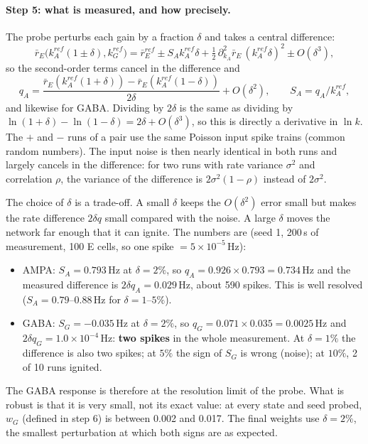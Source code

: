 \documentclass[11pt]{article}
\newcommand{\kA}{k_A}
\newcommand{\kG}{k_G}
\begin{document}
\paragraph{Step 5: what is measured, and how precisely.}
The probe perturbs each gain by a fraction $\delta$ and takes a central difference:
\[
\bar r_E\big(\kA^{ref}(1\pm\delta),\kG^{ref}\big) = \bar r_E^{ref} \pm S_A\kA^{ref}\delta
+ \tfrac12\,\partial^2_{\kA}\bar r_E\,(\kA^{ref}\delta)^2 \pm O(\delta^3),
\]
so the second-order terms cancel in the difference and
\begin{equation}
q_A = \frac{\bar r_E(\kA^{ref}(1+\delta)) - \bar r_E(\kA^{ref}(1-\delta))}{2\delta} + O(\delta^2),\qquad
S_A = q_A/\kA^{ref},
\end{equation}
and likewise for GABA. Dividing by $2\delta$ is the same as dividing by $\ln(1+\delta)-\ln(1-\delta) = 2\delta+O(\delta^3)$,
so this is directly a derivative in $\ln k$. The $+$ and $-$ runs of a pair use the same Poisson input spike trains
(common random numbers). The input noise is then nearly identical in both runs and largely cancels in the difference:
for two runs with rate variance $\sigma^2$ and correlation $\rho$, the variance of the difference is $2\sigma^2(1-\rho)$
instead of $2\sigma^2$.

The choice of $\delta$ is a trade-off. A small $\delta$ keeps the $O(\delta^2)$ error small but makes the rate
difference $2\delta q$ small compared with the noise. A large $\delta$ moves the network far enough that it can
ignite. The numbers are (seed 1, 200\,s of measurement, 100 E cells, so one spike $= 5\times10^{-5}$\,Hz):
\begin{itemize}
\item AMPA: $S_A = 0.793$\,Hz at $\delta=2\%$, so $q_A = 0.926\times0.793 = 0.734$\,Hz and the measured difference is
$2\delta q_A = 0.029$\,Hz, about 590 spikes. This is well resolved ($S_A = 0.79$--$0.88$\,Hz for $\delta = 1$--$5\%$).
\item GABA: $S_G = -0.035$\,Hz at $\delta=2\%$, so $q_G = 0.071\times0.035 = 0.0025$\,Hz and $2\delta q_G = 1.0\times10^{-4}$\,Hz:
\textbf{two spikes} in the whole measurement. At $\delta=1\%$ the difference is also two spikes; at $5\%$ the sign of
$S_G$ is wrong (noise); at $10\%$, 2 of 10 runs ignited.
\end{itemize}
The GABA response is therefore at the resolution limit of the probe. What is robust is that it is very small, not its
exact value: at every state and seed probed, $w_G$ (defined in step 6) is between 0.002 and 0.017. The final weights
use $\delta=2\%$, the smallest perturbation at which both signs are as expected.
\end{document}
